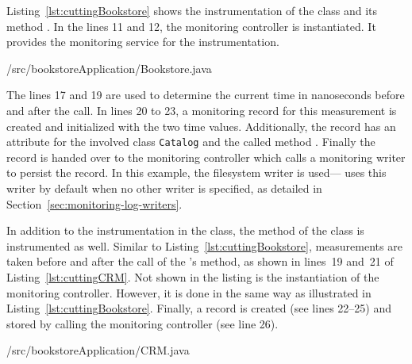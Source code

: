 \noindent Listing~\ref{lst:cuttingBookstore} shows the instrumentation of the  class and its method . In the lines 11 and 12, the monitoring controller is instantiated. It provides the monitoring service for the instrumentation.


\setJavaCodeListing
%
{\manualInstrumentedBookstoreApplicationDir/src/bookstoreApplication/Bookstore.java}
 
\noindent The lines 17 and 19 are used to determine the current time in nanoseconds before and after the  call. In lines 20 to 23, a monitoring record for this measurement is created and initialized with the two time values. Additionally, the record has an attribute for the involved class \verb!Catalog! and the called method . Finally the record is handed over to the monitoring controller which calls a monitoring writer to persist the record. %
In this example, the filesystem writer is used---\Kieker{} uses this writer by default when no other writer is specified, %
as detailed in Section~\ref{sec:monitoring-log-writers}. %

In addition to the instrumentation in the  class, the  method of the  class is instrumented as well. Similar to Listing~\ref{lst:cuttingBookstore}, measurements are taken before and after the call of the 's  method, as shown in %
lines~19 and~21 of Listing~\ref{lst:cuttingCRM}. Not shown in the listing is the instantiation of the monitoring controller. However, it is done in the same way as illustrated in Listing~\ref{lst:cuttingBookstore}. %
Finally, a record is created (see lines 22--25) and stored by calling the monitoring controller (see line 26).

\setJavaCodeListing
%
{\manualInstrumentedBookstoreApplicationDir/src/bookstoreApplication/CRM.java}

